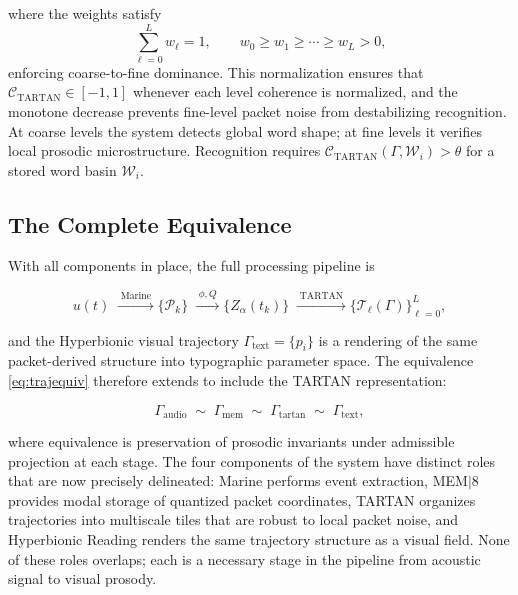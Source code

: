 \documentclass[12pt, a4paper]{article}
\begin{document}
where the weights satisfy
\begin{equation}
\sum_{\ell=0}^{L} w_\ell = 1, \qquad w_0 \geq w_1 \geq \cdots \geq w_L > 0,
\label{eq:tartanweights}
\end{equation}
enforcing coarse-to-fine dominance. This normalization ensures that $\mathcal{C}_{\mathrm{TARTAN}} \in [-1, 1]$ whenever each level coherence is normalized, and the monotone decrease prevents fine-level packet noise from destabilizing recognition. At coarse levels the system detects global word shape; at fine levels it verifies local prosodic microstructure. Recognition requires $\mathcal{C}_{\mathrm{TARTAN}}(\Gamma, \mathcal{W}_i) > \theta$ for a stored word basin $\mathcal{W}_i$.

\subsection{The Complete Equivalence}

With all components in place, the full processing pipeline is

\begin{equation}
u(t)
\;\xrightarrow{\;\text{Marine}\;}
\{\mathcal{P}_k\}
\;\xrightarrow{\;\phi, Q\;}
\{Z_\alpha(t_k)\}
\;\xrightarrow{\;\text{TARTAN}\;}
\{\mathcal{T}_\ell(\Gamma)\}_{\ell=0}^{L},
\label{eq:pipeline}
\end{equation}

and the Hyperbionic visual trajectory $\Gamma_{\mathrm{text}} = \{p_i\}$ is a rendering of the same packet-derived structure into typographic parameter space. The equivalence \eqref{eq:trajequiv} therefore extends to include the TARTAN representation:

\begin{equation}
\Gamma_{\mathrm{audio}} \;\sim\; \Gamma_{\mathrm{mem}} \;\sim\; \Gamma_{\mathrm{tartan}} \;\sim\; \Gamma_{\mathrm{text}},
\label{eq:fullequiv}
\end{equation}

where equivalence is preservation of prosodic invariants under admissible projection at each stage. The four components of the system have distinct roles that are now precisely delineated: Marine performs event extraction, MEM$|$8 provides modal storage of quantized packet coordinates, TARTAN organizes trajectories into multiscale tiles that are robust to local packet noise, and Hyperbionic Reading renders the same trajectory structure as a visual field. None of these roles overlaps; each is a necessary stage in the pipeline from acoustic signal to visual prosody.
\end{document}
